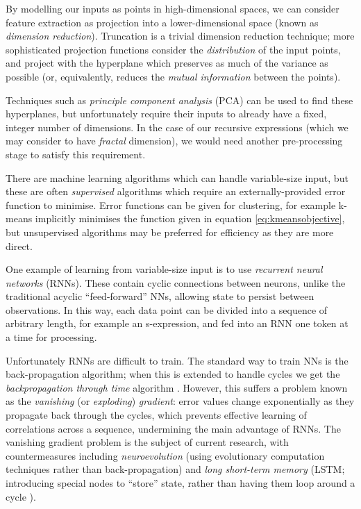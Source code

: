 By modelling our inputs as points in high-dimensional spaces, we can consider feature extraction as projection into a lower-dimensional space (known as \emph{dimension reduction}). Truncation is a trivial dimension reduction technique; more sophisticated projection functions consider the \emph{distribution} of the input points, and project with the hyperplane which preserves as much of the variance as possible (or, equivalently, reduces the \emph{mutual information} between the points).

Techniques such as \emph{principle component analysis} (PCA) can be used to find these hyperplanes, but unfortunately require their inputs to already have a fixed, integer number of dimensions. In the case of our recursive expressions (which we may consider to have \emph{fractal} dimension), we would need another pre-processing stage to satisfy this requirement.

There are machine learning algorithms which can handle variable-size input, but these are often \emph{supervised} algorithms which require an externally-provided error function to minimise. Error functions can be given for clustering, for example k-means implicitly minimises the function given in equation \ref{eq:kmeansobjective}, but unsupervised algorithms may be preferred for efficiency as they are more direct.

One example of learning from variable-size input is to use \emph{recurrent neural networks} (RNNs). These contain cyclic connections between neurons, unlike the traditional acyclic ``feed-forward'' NNs, allowing state to persist between observations. In this way, each data point can be divided into a sequence of arbitrary length, for example an s-expression, and fed into an RNN one token at a time for processing.

Unfortunately RNNs are difficult to train. The standard way to train NNs is the back-propagation algorithm; when this is extended to handle cycles we get the \emph{backpropagation through time} algorithm \cite{werbos1990backpropagation}. However, this suffers a problem known as the \emph{vanishing} (or \emph{exploding}) \emph{gradient}: error values change exponentially as they propagate back through the cycles, which prevents effective learning of correlations across a sequence, undermining the main advantage of RNNs. The vanishing gradient problem is the subject of current research, with countermeasures including \emph{neuroevolution} (using evolutionary computation techniques rather than back-propagation) and \emph{long short-term memory} (LSTM; introducing special nodes to ``store'' state, rather than having them loop around a cycle \cite{hochreiter1997long}).

